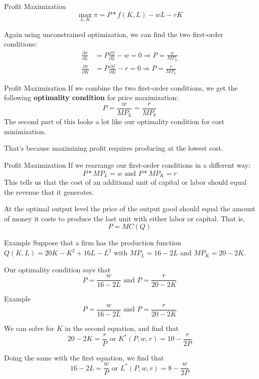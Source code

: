 \documentclass{beamer}
\begin{document}
\begin{frame}{Profit Maximization}
  $$
    \max_{L,K} \pi = P*f(K,L) - wL - rK
  $$
  
  Again using unconstrained optimization, we can find the two first-order conditions:
  \begin{align*}
    \frac{\partial \pi}{\partial L} & =P \frac{\partial f}{\partial L} - w = 0 \Rightarrow P = \frac{w}{MP_L} \\
    \frac{\partial \pi}{\partial K} & =P \frac{\partial f}{\partial K} - r = 0 \Rightarrow P = \frac{r}{MP_k}
  \end{align*}
\end{frame}

\begin{frame}{Profit Maximization}
  If we combine the two first-order conditions, we get the following \textbf{optimality condition} for price maximization:
  $$
    P = \frac{w}{MP_L} = \frac{r}{MP_k}
  $$
  The second part of this looks a lot like our optimality condition for cost minimization.

  \bigskip
  That's because maximizing profit requires producing at the lowest cost.
\end{frame}

\begin{frame}{Profit Maximization}
  If we rearrange our first-order conditions in a different way:
  $$
    P * MP_L = w \text{ and } P * MP_K = r
  $$
  This tells us that the cost of an additional unit of capital or labor should equal the revenue that it generates.

  \bigskip
  At the optimal output level the price of the output good should equal the amount of money it costs to produce the last unit with either labor or capital. That is,
  $$
    P = MC(Q)
  $$
\end{frame}


\begin{frame}{Example}
  Suppose that a firm has the production function $Q(K,L) = 20K-K^2 + 16L-L^2$ with $MP_L = 16-2L$ and $MP_K = 20-2K$.

  \bigskip
  Our optimality condition says that
  $$
    P = \frac{w}{16 - 2L} \text{ and } P = \frac{r}{20 - 2K}
  $$

\end{frame}

\begin{frame}{Example}
  $$
    P = \frac{w}{16 - 2L} \text{ and } P = \frac{r}{20 - 2K}
  $$

  \bigskip
  We can solve for $K$ in the second equation, and find that
  $$
    20-2K=\frac{r}{P} \text{ or }  K^*(P,w,r) = 10- \frac{r}{2P}
  $$

  Doing the same with the first equation, we find that
  $$
    16-2L = \frac{w}{P} \text{ or } L^*(P,w,r) = 8 - \frac{w}{2P}
  $$
\end{frame}
\end{document}

